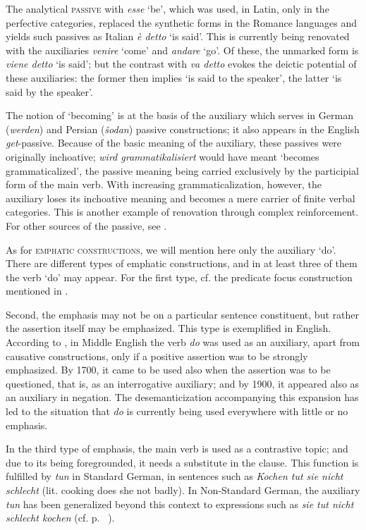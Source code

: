 The analytical \textsc{passive} with \textit{esse} ‘be’, which was used, in Latin, only in the perfective categories, replaced the synthetic forms in the Romance languages and yields such passives as Italian \textit{è detto} ‘is said’. This is currently being renovated with the auxiliaries \textit{venire} ‘come’ and \textit{andare} ‘go’. Of these, the unmarked form is \textit{viene detto} ‘is said’; but the contrast with \textit{va detto} evokes the deictic potential of these auxiliaries: the former then implies ‘is said to the speaker’, the latter ‘is said by the speaker’.

The notion of ‘becoming’ is at the basis of the auxiliary which serves in German (\textit{werden}) and Persian (\textit{šodan}) passive constructions; it also appears in the English \textit{get}{}-passive. Because of the basic meaning of the auxiliary, these passives were originally inchoative; \textit{wird grammatikalisiert} would have meant ‘becomes grammaticalized’, the passive meaning being carried exclusively by the participial form of the main verb. With increasing grammaticalization, however, the auxiliary loses its inchoative meaning and becomes a mere carrier of finite verbal categories. This is another example of renovation through complex reinforcement. For other sources of the passive, see \citet[85f]{Givón1979}.

As for \textsc{emphatic constructions}, we will mention here only the auxiliary ‘do’. There are different types of emphatic constructions, and in at least three of them the verb ‘do’ may appear. For the first type, cf. the predicate focus construction mentioned in .

Second, the emphasis may not be on a particular sentence constituent, but rather the assertion itself may be emphasized. This type is exemplified in English. According to \citet[55]{Traugott1980}, in Middle English the verb \textit{do} was used as an auxiliary, apart from causative constructions, only if a positive assertion was to be strongly emphasized. By 1700, it came to be used also when the assertion was to be questioned, that is, as an interrogative auxiliary; and by 1900, it appeared also as an auxiliary in negation. The desemanticization accompanying this expansion has led to the situation that \textit{do} is currently being used everywhere with little or no emphasis.

\label{page35}In the third type of emphasis, the main verb is used as a contrastive topic; and due to its being foregrounded, it needs a substitute in the clause. This function is fulfilled by \textit{tun} in Standard German, in sentences such as \textit{Kochen tut sie nicht schlecht} (lit. cooking does she not badly). In Non-Standard German, the auxiliary \textit{tun} has been generalized beyond this context to expressions such as \textit{sie tut nicht schlecht kochen} (cf. p.~\pageref{page123}\chk%
).

